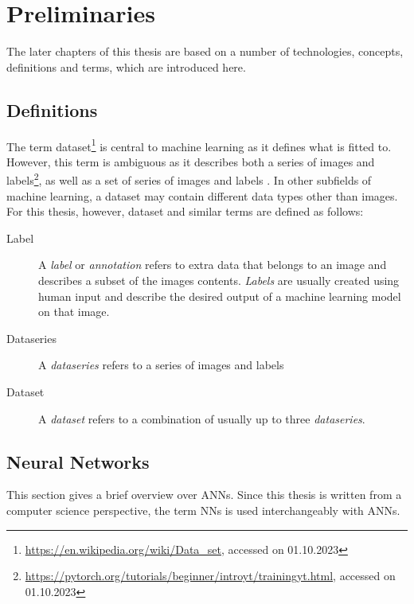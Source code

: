 \documentclass[10pt]{book}
\begin{document}
\chapter{Preliminaries}
\label{chap:prelim}

The later chapters of this thesis are based on a number of technologies, concepts, definitions and terms, which are introduced here.

\section{Definitions}

The term dataset\footnote{\url{https://en.wikipedia.org/wiki/Data_set}, accessed on 01.10.2023} is central to machine learning as it defines what is fitted to. However, this term is ambiguous as it describes both a series of images and labels\footnote{\url{https://pytorch.org/tutorials/beginner/introyt/trainingyt.html}, accessed on 01.10.2023}, as well as a set of series of images and labels \cite{lin2014microsoft}. In other subfields of machine learning, a dataset may contain different data types other than images. For this thesis, however, dataset and similar terms are defined as follows:

\begin{description}
  \item[Label] A \textit{label} or \textit{annotation} refers to extra data that belongs to an image and describes a subset of the images contents. \textit{Labels} are usually created using human input and describe the desired output of a machine learning model on that image.
  \item[Dataseries] A \textit{dataseries} refers to a series of images and labels
  \item[Dataset] A \textit{dataset} refers to a combination of usually up to three \textit{dataseries}.
\end{description}

\section{Neural Networks}

This section gives a brief overview over \acp{ANN}. Since this thesis is written from a computer science perspective, the term \acp{NN} is used interchangeably with \acp{ANN}.
\end{document}

